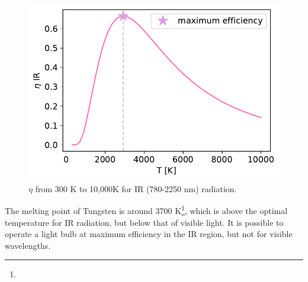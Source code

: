 \documentclass{article}
\begin{document}
\begin{enumerate}
\begin{enumerate}
  \begin{figure}[h]
    \centering 
    \captionsetup{margin=3.2cm}
    \includegraphics[width=0.5\linewidth]{Q2d.pdf}
    \caption{\label{fig:2d} $\eta$ from 300 K to 10,000K for IR (780-2250 nm) radiation.}
  \end{figure}

  The melting point of Tungsten is around 3700 K\footnote{}, which is above the optimal temperature for IR radiation, but below that of visible light. 
  It is possible to operate a light bulb at maximum efficiency in the IR region, but not for visible wavelengths.
\end{enumerate}


\end{enumerate}
\end{document}
